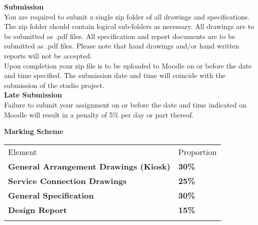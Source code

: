 \textbf{Submission}\\

You are required to submit a single zip folder of all drawings and specifications.  The zip folder should contain logical sub-folders as necessary.  All drawings are to be submitted as .pdf files.  All specification and report documents are to be submitted as .pdf files.  Please note that hand drawings and/or hand written reports will not be accepted.\\

Upon completion your zip file is to be uploaded to Moodle on or before the date and time specified.  The submission date and time will coincide with the submission of the studio project.\\  


\textbf{Late Submission}\\
Failure to submit your assignment on or before the date and time indicated on Moodle will result in a penalty of 5\% per day or part thereof.  

\vspace{0.5cm}
\textbf{Marking Scheme}\\

\begin{table}[h!]
     \begin{center}
     \begin{tabular}{p{8cm}  p{2cm} }
     \toprule
      \textbf\large{Element} & \textbf\large{Proportion} \\ 
    \cmidrule(r){1-1}\cmidrule(lr){2-2}
      \textbf{General Arrangement Drawings (Kiosk)} & \textbf{30\%}\\
      \textbf{Service Connection Drawings} & \textbf{25\%}\\
      \textbf{General Specification} & \textbf{30\%}\\      
      \textbf{Design Report} & \textbf{15\%}\\     
      \\ \bottomrule
      \end{tabular}
      \label{tbl:markSchemeAsmt4}
      \end{center}
 \end{table}


